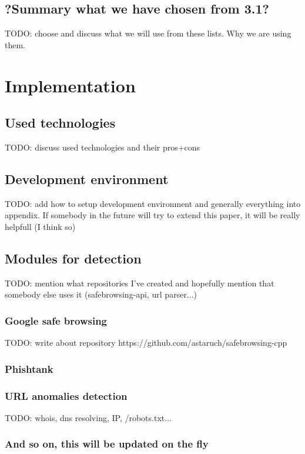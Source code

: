 \documentclass[
  digital, %
  twoside, %
  table,   %
  nolof,     %
  nolot,     %
]{fithesis3}
\begin{document}
\section{?Summary what we have chosen from 3.1?}

TODO: choose and discuss what we will use from these lists. Why we are using them. 

\chapter{Implementation}

\section{Used technologies}
TODO: discuss used technologies and their pros+cons

\section{Development environment}

TODO: add how to setup development environment and generally everything into appendix. If somebody in the future will try to extend this paper, it will be really helpfull (I think so)

\section{Modules for detection}
TODO: mention what repositories I've created and hopefully mention that somebody else uses it (safebrowsing-api, url parser...)

\subsection{Google safe browsing}
TODO: write about repository https://github.com/astaruch/safebrowsing-cpp
\subsection{Phishtank}

\subsection{URL anomalies detection}
TODO: whois, dns resolving, IP, /robots.txt...

\subsection{And so on, this will be updated on the fly}
\end{document}
